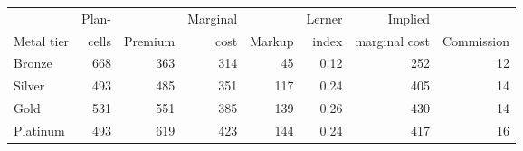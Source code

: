\begin{tabular}{lrrrrrrr}
\hline\hline
 & Plan- & & Marginal & & Lerner & Implied & \\
Metal tier & cells & Premium & cost & Markup & index & marginal cost & Commission \\
\hline
Bronze & 668 & 363 & 314 & 45 & 0.12 & 252 & 12 \\
Silver & 493 & 485 & 351 & 117 & 0.24 & 405 & 14 \\
Gold & 531 & 551 & 385 & 139 & 0.26 & 430 & 14 \\
Platinum & 493 & 619 & 423 & 144 & 0.24 & 417 & 16 \\
\hline\hline
\end{tabular}
